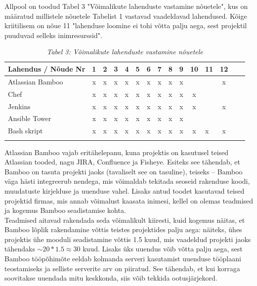 \documentclass[12pt]{report}
\begin{document}
  Allpool on toodud Tabel 3 "Võimalikute lahenduste vastamine nõuetele", kus on määratud millistele nõuetele Tabelist 1 vastavad vaadeldavad lahendused. Kõige kriitilisem on nõue 11 "lahenduse loomine ei tohi võtta palju aega, sest projektil puuduvad selleks inimresurssid".
  
  \begin{table}[H] 
    \begin{tabular}{ |l|c|c|c|c|c|c|c|c|c|c V{4} c V{4} c| }
      \hline
      \textbf{Lahendus / Nõude Nr} & \textbf{1} & \textbf{2} & \textbf{3} & \textbf{4} & \textbf{5} & \textbf{6} & \textbf{7} & \textbf{8} & \textbf{9} & \textbf{10} & \textbf{11} & \textbf{12}\\
      \hline
      Atlassian Bamboo & x & x & x & x & x & x & x & x & x & & & x\\
      \hline
      Chef & x & x & x & x & x & x & x & x & x & x & & \\
      \hline
      Jenkins & x & x & x & x & x & x & x & x & x & x & & x\\
      \hline
      Ansible Tower & x & x & x & x & x & x & x & x & x & & & \\
      \hline
      Bash skript & x & x & x & x & x & x & x & x & x & x & x & x\\
      \hline
    \end{tabular}
    \caption*{\textit{Tabel 3: Võimalikute lahenduste vastamine nõuetele}}
  \end{table}

  Atlassian Bamboo vajab eritähelepanu, kuna projektis on kasutusel teised Atlassian tooded, nagu JIRA, Confluence ja Fisheye. Esiteks see tähendab, et Bamboo on tasuta projekti jaoks (tavaliselt see on tasuline), teiseks \--- Bamboo väga hästi integreerub nendega, mis võimaldab tekitada seoseid rakenduse koodi, muudatuste kirjelduse ja uuenduse vahel. Lisaks antud toodet kasutavad teised projektid firmas, mis annab võimalust kaasata inimesi, kellel on olemas teadmised ja kogemus Bamboo seadistamise kohta.\\
  
  Teadmised aitavad rakendada seda võimalikult kiiresti, kuid kogemus näitas, et Bamboo lõplik rakendamine võttis teistes projektides palju aega: näiteks, ühes projektis ühe mooduli seadistamine võttis 1.5 kuud, mis vaadeldud projekti jaoks tähendaks $\sim20*1.5 \approx 30$ kuud. Lisaks üks uuendus võib võtta palju aega, sest Bamboo tööpõhimõte eeldab kolmanda serveri kasutamist uuenduse tööplaani teostamiseks ja selliste serverite arv on piiratud. See tähendab, et kui korraga soovitakse uuendada mitu keskkonda, siis võib tekkida ootusjärjekord.\\
  
\end{document}
